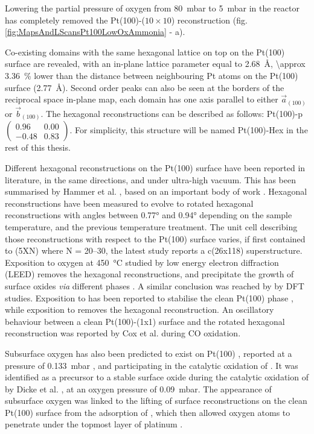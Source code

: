 Lowering the partial pressure of oxygen from \qty{80}{\milli\bar} to \qty{5}{\milli\bar} in the reactor has completely removed the Pt(100)-($10\times10$) reconstruction (fig. \ref{fig:MapsAndLScansPt100LowOxAmmonia} - a).

Co-existing domains with the same hexagonal lattice on top on the Pt(100) surface are revealed, with an in-plane lattice parameter equal to \qty{2.68}{\angstrom}, \qty{\approx 3.36}{\percent} lower than the distance between neighbouring Pt atoms on the Pt(100) surface (\qty{2.77}{\angstrom}).
Second order peaks can also be seen at the borders of the reciprocal space in-plane map, each domain has one axis parallel to either $\vec{a}_{(100)}$ or $\vec{b}_{(100)}$.
The hexagonal reconstructions can be described as follows: Pt(100)-p$\begin{pmatrix} 0.96 & 0.00\\ -0.48 & 0.83 \end{pmatrix}$.
For simplicity, this structure will be named Pt(100)-Hex in the rest of this thesis.

Different hexagonal reconstructions on the Pt(100) surface have been reported in literature, in the same directions, and under ultra-high vacuum.
This has been summarised by Hammer et al. \parencite*{Hammer2016}, based on an important body of work \parencite{Heilmann1979, Vanhove1981, Heinz1982, Mase1992, Kuhnke1992, Borg1994, VanBeurden2004, Havu2010}.
Hexagonal reconstructions have been measured to evolve to rotated hexagonal reconstructions with angles between \ang{0.77} and \ang{0.94} depending on the sample temperature, and the previous temperature treatment.
The unit cell describing those reconstructions with respect to the Pt(100) surface varies, if first contained to (5XN) where N = 20–30, the latest study reports a c(26x118) superstructure.
Exposition to oxygen at \qty{450}{\degreeCelsius} studied by low energy electron diffraction (LEED) removes the hexagonal reconstructions, and precipitate the growth of surface oxides \textit{via} different phases \parencite{BradleyShumbera2007, BradleyShumbera2007a}.
A similar conclusion was reached by \cite{Deskins2005} by DFT studies.
Exposition to  has been reported to stabilise the clean Pt(100) phase \parencite{Heinz1982}, while exposition to  removes the hexagonal reconstruction.
An oscillatory behaviour between a clean Pt(100)-(1x1) surface and the rotated hexagonal reconstruction was reported by Cox et al. \parencite*{Cox1983} during CO oxidation.

Subsurface oxygen has also been predicted to exist on Pt(100) \parencite{Gu2007}, reported at a pressure of \qty{0.133}{\milli\bar} \parencite{McMillan2005}, and participating in the catalytic oxidation of .
It was identified as a precursor to a stable surface oxide during the catalytic oxidation of  by Dicke et al. \parencite*{Dicke2000}, at an oxygen pressure of \qty{0.09}{\milli\bar}.
The appearance of subsurface oxygen was linked to the lifting of surface reconstructions on the clean Pt(100) surface from the adsorption of , which then allowed oxygen atoms to penetrate under the topmost layer of platinum \parencite{Rotermund1993, Lauterbach1994}.

